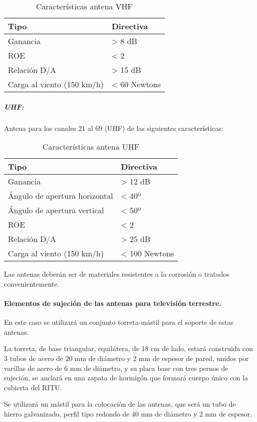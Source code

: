 \begin{table}[H]
\caption{Características antena VHF}
\centering
\label{antvhf}
\begin{tabular}{l l}
    Tipo & Directiva\\
    \hline
    \hline
    Ganancia & > 8 dB\\
    ROE &  < 2 \\
    Relación D/A & > 15 dB \\
    Carga al viento (150 km/h) & < 60 Newtons
\end{tabular}
\end{table}

\subparagraph*{UHF: }

Antena para los canales 21 al 69 (UHF) de las siguientes características: 

\begin{table}[H]
\caption{Características antena UHF}
\centering
\label{antuhf}
\begin{tabular}{l l}
    Tipo & Directiva\\
    \hline
    \hline
    Ganancia & > 12 dB\\
    Ángulo de apertura horizontal & < 40º\\
    Ángulo de apertura vertical & < 50º\\
    ROE &  < 2 \\
    Relación D/A & > 25 dB \\
    Carga al viento (150 km/h) & < 100 Newtons
\end{tabular}
\end{table}

Las antenas deberán ser de materiales resistentes a la corrosión o tratados convenientemente.

\paragraph{Elementos de sujeción de las antenas para televisión terrestre.}

En este caso se utilizará un conjunto torreta-mástil para el soporte de estas antenas.

La torreta, de base triangular, equilátera, de 18 cm de lado, estará construida con 3 tubos de acero de 20 mm de diámetro y 2 mm de espesor de pared, unidos por varillas de acero de 6 mm de diámetro, y su placa base con tres pernos de sujeción, se anclará en una zapata de hormigón que formará cuerpo único con la cubierta del RITU.

Se utilizará un mástil para la colocación de las antenas, que será un tubo de hierro galvanizado, perfil tipo redondo de 40 mm de diámetro y 2 mm de espesor.

